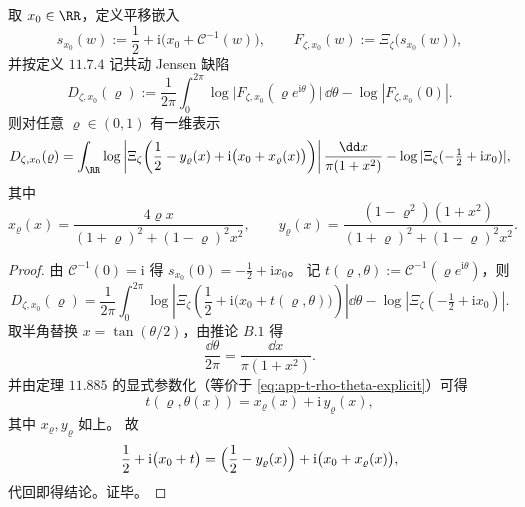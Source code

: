 \begin{conclusion}\label{con:xi-comoving-jensen-cauchy-timefiber-onevariable}
取 \(x_0\in\RR\)，定义平移嵌入
\[
s_{x_0}(w):=\frac12+\mathrm{i}\bigl(x_0+\mathcal C^{-1}(w)\bigr),\qquad
F_{\zeta,x_0}(w):=\Xi_\zeta\!\bigl(s_{x_0}(w)\bigr),
\]
并按定义 \(11.7.4\) 记共动 Jensen 缺陷
\[
D_{\zeta,x_0}(\varrho)
:=\frac{1}{2\pi}\int_0^{2\pi}\log\bigl|F_{\zeta,x_0}(\varrho e^{\mathrm{i}\theta})\bigr|\,\dd\theta
-\log|F_{\zeta,x_0}(0)|.
\]
则对任意 \(\varrho\in(0,1)\) 有一维表示
\[
D_{\zeta,x_0}(\varrho)
=\int_{\RR}
\log\left|
\Xi_\zeta\!\left(
\frac12-y_\varrho(x)+\mathrm{i}\bigl(x_0+x_\varrho(x)\bigr)
\right)\right|
\frac{\dd x}{\pi(1+x^2)}
-\log|\Xi_\zeta(-\tfrac12+\mathrm{i}x_0)|,
\]
其中
\[
x_\varrho(x)=\frac{4\varrho x}{(1+\varrho)^2+(1-\varrho)^2x^2},
\qquad
y_\varrho(x)=\frac{(1-\varrho^2)(1+x^2)}{(1+\varrho)^2+(1-\varrho)^2x^2}.
\]
\end{conclusion}
\begin{proof}
由 \(\mathcal C^{-1}(0)=\mathrm{i}\) 得
\(
s_{x_0}(0)=-\tfrac12+\mathrm{i}x_0
\)。
记
\(
t(\varrho,\theta):=\mathcal C^{-1}(\varrho e^{\mathrm{i}\theta})
\)，则
\[
D_{\zeta,x_0}(\varrho)
=\frac{1}{2\pi}\int_0^{2\pi}
\log\left|\Xi_\zeta\!\left(\frac12+\mathrm{i}\bigl(x_0+t(\varrho,\theta)\bigr)\right)\right|
\dd\theta
-\log|\Xi_\zeta(-\tfrac12+\mathrm{i}x_0)|.
\]
取半角替换 \(x=\tan(\theta/2)\)，由推论 \(B.1\) 得
\[
\frac{\dd\theta}{2\pi}=\frac{\dd x}{\pi(1+x^2)}.
\]
并由定理 \(11.885\) 的显式参数化（等价于
\eqref{eq:app-t-rho-theta-explicit}）可得
\[
t(\varrho,\theta(x))=x_\varrho(x)+\mathrm{i}\,y_\varrho(x),
\]
其中 \(x_\varrho,y_\varrho\) 如上。
故
\[
\frac12+\mathrm{i}\bigl(x_0+t\bigr)
=\Bigl(\frac12-y_\varrho(x)\Bigr)+\mathrm{i}\bigl(x_0+x_\varrho(x)\bigr),
\]
代回即得结论。证毕。
\end{proof}

